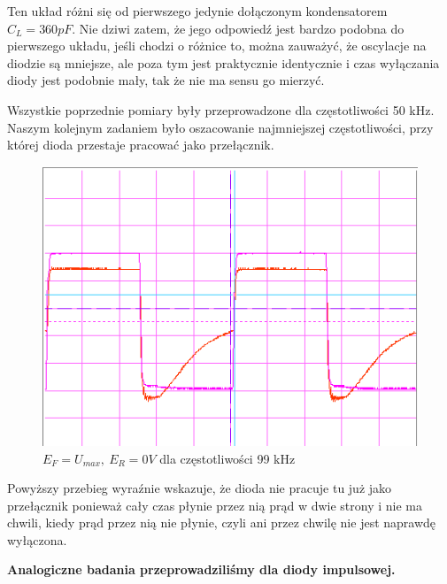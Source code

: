 \documentclass[a4paper,11pt]{article}
\begin{document}
Ten układ różni się od pierwszego jedynie dołączonym kondensatorem \(C_L = 360 pF\). Nie dziwi zatem, że jego odpowiedź jest bardzo podobna do pierwszego układu, jeśli chodzi o różnice to, można zauważyć, że oscylacje na diodzie są mniejsze, ale poza tym jest praktycznie identycznie i czas wyłączania diody jest podobnie mały, tak że nie ma sensu go mierzyć.

Wszystkie poprzednie pomiary były przeprowadzone dla częstotliwości 50 kHz. Naszym kolejnym zadaniem było oszacowanie najmniejszej częstotliwości, przy której dioda przestaje pracować jako przełącznik.

\begin{figure} [H]
  \begin{center}
    \includegraphics{../Obrazki_i_tekst/obrobione/2ciety.png}
    \caption{\( E_F = U_{max}, \ E_R = 0V \) dla częstotliwości 99 kHz }
  \end{center}
\end{figure}


Powyższy przebieg wyraźnie wskazuje, że dioda nie pracuje tu już jako przełącznik ponieważ cały czas płynie przez nią prąd w dwie strony i nie ma chwili, kiedy prąd przez nią nie płynie, czyli ani przez chwilę nie jest naprawdę wyłączona.

\textbf{Analogiczne badania przeprowadziliśmy dla diody impulsowej.}
\end{document}
